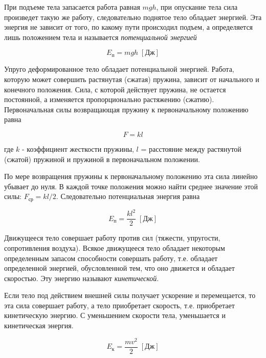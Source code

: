 \documentclass[a4paper,12pt]{article}
\begin{document}
		При подъеме тела запасается работа равная $mgh$, при опускание тела сила произведет 
		такую же работу, следовательно поднятое тело обладает энергией. Эта энергия не
		зависит от того, по какому пути происходил подъем, а определяется лишь положением 
		тела и называется \textit{потенциальной энергией}

		\begin{equation}
			E_{\text{п}} = mgh \; [\text{Дж}]
		\end{equation}

		Упруго деформированное тело обладает потенциальной энергией. Работа, которую может
		совершить растянутая (сжатая) пружина, зависит от начального и конечного положения.
		Сила, с которой действует пружина, не остается постоянной, а изменяется пропорционально
		растяжению (сжатию). Первоначальная силы возвращающая пружину к первоначальному
		положению равна

		\begin{equation}
			F = kl
		\end{equation}

		где $k$ - коэффициент жесткости пружины, $l$ = расстояние между растянутой (сжатой)
		пружиной и пружиной в первоначальном положении.

		По мере возвращения пружины к первоначальному положению эта сила линейно убывает
		до нуля. В каждой точке положения можно найти среднее значение этой силы: 
		$F_{\text{ср}} = kl/2$. Следовательно потенциальная энергия равна

		\begin{equation}
			E_{\text{п}} = \frac{kl^2}{2} \; [\text{Дж}]
		\end{equation}

		Движущееся тело совершает работу против сил (тяжести, упругости, сопротивления 
		воздуха). Всякое движущееся тело обладает некоторым определенным запасом способности 
		совершать работу, т.е. обладает определенной энергией, обусловленной тем, что оно 
		движется и обладает скоростью. Эту энергию называют \textit{кинетической}.
		
		Если тело под действием внешней силы получает ускорение и перемещается, то эта
		сила совершает работу, а тело приобретает скорость, т.е. приобретает кинетическую 
		энергию. С уменьшением скорости тела, уменьшается и кинетическая энергия.

		\begin{equation}
			E_{\text{к}} = \frac{mv^2}{2} \; [\text{Дж}]
		\end{equation}
\end{document}
